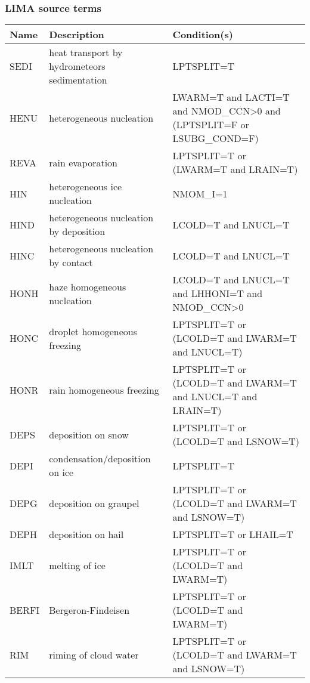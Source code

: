 \subsubsection{LIMA source terms}

\begin{longtable} {|p{}|p{}|p{}|}
\hline
Name & Description & Condition(s) \\
\hline \hline
\endhead
SEDI   & heat transport by hydrometeors sedimentation  & LPTSPLIT=T \\\hline
HENU   & heterogeneous nucleation                      & LWARM=T and LACTI=T and NMOD\_CCN>0 and (LPTSPLIT=F or LSUBG\_COND=F) \\\hline
REVA   & rain evaporation                              & LPTSPLIT=T or (LWARM=T and LRAIN=T) \\\hline
HIN    & heterogeneous ice nucleation                  & NMOM\_I=1 \\\hline
HIND   & heterogeneous nucleation by deposition        & LCOLD=T and LNUCL=T \\\hline
HINC   & heterogeneous nucleation by contact           & LCOLD=T and LNUCL=T \\\hline
HONH   & haze homogeneous nucleation                   & LCOLD=T and LNUCL=T and LHHONI=T and NMOD\_CCN>0 \\\hline
HONC   & droplet homogeneous freezing                  & LPTSPLIT=T or (LCOLD=T and LWARM=T and LNUCL=T) \\\hline
HONR   & rain homogeneous freezing                     & LPTSPLIT=T or (LCOLD=T and LWARM=T and LNUCL=T and LRAIN=T) \\\hline
DEPS   & deposition on snow                            & LPTSPLIT=T or (LCOLD=T and LSNOW=T) \\\hline
DEPI   & condensation/deposition on ice                & LPTSPLIT=T \\\hline
DEPG   & deposition on graupel                         & LPTSPLIT=T or (LCOLD=T and LWARM=T and LSNOW=T) \\\hline
DEPH   & deposition on hail                            & LPTSPLIT=T or LHAIL=T \\\hline
IMLT   & melting of ice                                & LPTSPLIT=T or (LCOLD=T and LWARM=T) \\\hline
BERFI  & Bergeron-Findeisen                            & LPTSPLIT=T or (LCOLD=T and LWARM=T) \\\hline
RIM    & riming of cloud water                         & LPTSPLIT=T or (LCOLD=T and LWARM=T and LSNOW=T) \\\hline

\end{longtable}
